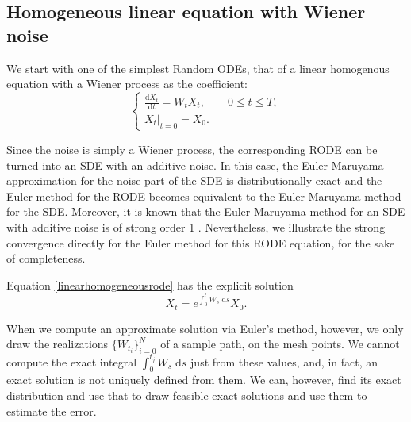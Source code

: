 \documentclass[reqno,12pt]{amsart}
\theoremstyle{plain} %
\theoremstyle{definition} %
\begin{document}
\subsection{Homogeneous linear equation with Wiener noise}
\label{seclinearhomogeneousrode}

We start with one of the simplest Random ODEs, that of a linear homogenous equation with a Wiener process as the coefficient:
\begin{equation}
    \label{linearhomogeneousrode}
    \begin{cases}
        \displaystyle \frac{\mathrm{d}X_t}{\mathrm{d} t} = W_t X_t, \qquad 0 \leq t \leq T, \\
        \left. X_t \right|_{t = 0} = X_0.
      \end{cases}
\end{equation}

Since the noise is simply a Wiener process, the corresponding RODE can be turned into an SDE with an additive noise. In this case, the Euler-Maruyama approximation for the noise part of the SDE is distributionally exact and the Euler method for the RODE becomes equivalent to the Euler-Maruyama method for the SDE. Moreover, it is known that the Euler-Maruyama method for an SDE with additive noise is of strong order 1 \cite{HighamKloeden2021}. Nevertheless, we illustrate the strong convergence directly for the Euler method for this RODE equation, for the sake of completeness.

Equation \eqref{linearhomogeneousrode} has the explicit solution
\begin{equation}
    \label{Xtlinearhomogeneousrodesolution}
    X_t = e^{\int_0^t W_s \;\mathrm{d}s}X_0.
\end{equation}

When we compute an approximate solution via Euler's method, however, we only draw the realizations $\{W_{t_i}\}_{i=0}^N$ of a sample path, on the mesh points. We cannot compute the exact integral $\int_0^{t_j} W_s\;\mathrm{d}s$ just from these values, and, in fact, an exact solution is not uniquely defined from them. We can, however, find its exact distribution and use that to draw feasible exact solutions and use them to estimate the error.
\end{document}
